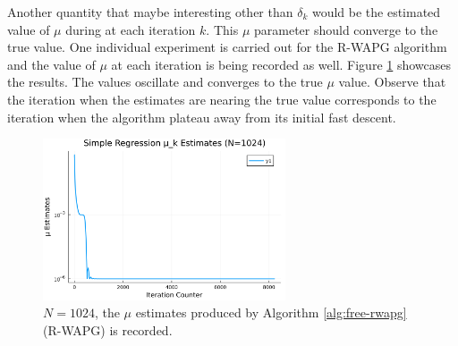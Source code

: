 \documentclass[12pt]{article}
\begin{document}
            \par
            Another quantity that maybe interesting other than $\delta_k$ would be the estimated value of $\mu$ during at each iteration $k$. 
            This $\mu$ parameter should converge to the true value. 
            One individual experiment is carried out for the R-WAPG algorithm and the value of $\mu$ at each iteration is being recorded as well. 
            Figure \ref{fig:simple-quadratic-r-wapg-mu-estimates} showcases the results. 
            The values oscillate and converges to the true $\mu$ value. 
            Observe that the iteration when the estimates are nearing the true value corresponds to the iteration when the algorithm plateau away from its initial fast descent. 
            \begin{figure}[H]
                \centering
                \includegraphics[width=0.64\textwidth]{assets/simple_regression_loss_sc_estimates_1024.png}
                \caption{$N = 1024$, the $\mu$ estimates produced by Algorithm \ref{alg:free-rwapg} (R-WAPG) is recorded. }
                \label{fig:simple-quadratic-r-wapg-mu-estimates}
            \end{figure}
\end{document}
